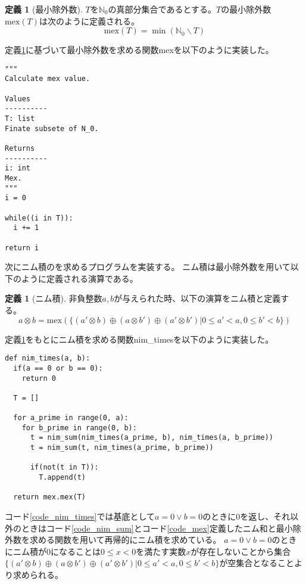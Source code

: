 \documentclass[uplatex,dvipdfmx,a4paper,10pt]{jsarticle}
\theoremstyle{definition}
\newtheorem{dfn}[thm]{定義}
\begin{document}
\begin{dfn}[最小除外数]
\(T\)を\(\mathbb{N}_0\)の真部分集合であるとする。\(T\)の最小除外数\(\text{mex}(T)\)は次のように定義される。
\begin{equation}
\text{mex}(T) = \min(\mathbb{N}_0 \backslash T)
\end{equation}
\label{dfn_mex}
\end{dfn}

定義\ref{dfn_mex}に基づいて最小除外数を求める関数mexを以下のように実装した。

\begin{lstlisting}[caption={最小除外数を求める関数}, label=code_mex]
"""
Calculate mex value.

Values
----------
T: list
Finate subsete of N_0.

Returns
----------
i: int
Mex.
"""
i = 0

while((i in T)):
  i += 1

return i
\end{lstlisting}

次にニム積のを求めるプログラムを実装する。
ニム積は最小除外数を用いて以下のように定義される演算である\cite{combination_game_theory}。

\begin{dfn}[ニム積]
非負整数\(a, b\)が与えられた時、以下の演算をニム積と定義する\cite{combination_game_theory}。
\begin{equation}
a \otimes b = \text{mex}(\{(a' \otimes b) \oplus (a \otimes b') \oplus (a' \otimes b') | 0 \leq a' < a, 0 \leq b' < b\})
\end{equation}
\label{dfn_nim_times}
\end{dfn}

定義\ref{dfn_nim_times}をもとにニム積を求める関数nim\_timesを以下のように実装した。

\begin{lstlisting}[caption={ニム積を求める関数}, label=code_nim_times]
def nim_times(a, b):
  if(a == 0 or b == 0):
    return 0
  
  T = []
  
  for a_prime in range(0, a):
    for b_prime in range(0, b):
      t = nim_sum(nim_times(a_prime, b), nim_times(a, b_prime))
      t = nim_sum(t, nim_times(a_prime, b_prime))

      if(not(t in T)):
        T.append(t)

  return mex.mex(T)
\end{lstlisting}

コード\ref{code_nim_times}では基底として\(a = 0 \lor b = 0\)のときに\(0\)を返し、それ以外のときはコード\ref{code_nim_sum}とコード\ref{code_mex}定義したニム和と最小除外数を求める関数を用いて再帰的にニム積を求めている。
\(a = 0 \lor b = 0\)のときにニム積が\(0\)になることは\(0 \leq x < 0\)を満たす実数\(x\)が存在しないことから集合\(\{(a' \otimes b) \oplus (a \otimes b') \oplus (a' \otimes b') | 0 \leq a' < a, 0 \leq b' < b\}\)が空集合となることより求められる。\\
\end{document}

